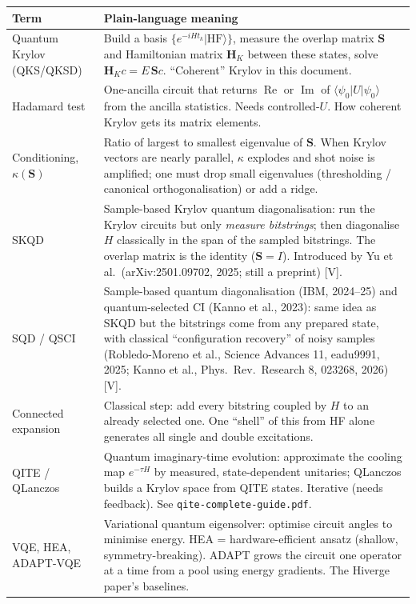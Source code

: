 \documentclass[11pt,a4paper]{article}
\newcommand{\ket}[1]{\lvert #1\rangle}
\newcommand{\bra}[1]{\langle #1\rvert}
\newcommand{\lV}{\textcolor{keyblue}{[V]}}   %
\begin{document}
\begin{center}\small
\begin{tabularx}{\linewidth}{@{}L{3.4cm}Y@{}}
\toprule
Term & Plain-language meaning\\\midrule
Quantum Krylov (QKS/QKSD) & Build a basis $\{e^{-iHt_k}\ket{\mathrm{HF}}\}$, measure the overlap matrix $\mathbf S$ and Hamiltonian matrix $\mathbf H_K$ between these states, solve $\mathbf H_K c=E\,\mathbf S c$. ``Coherent'' Krylov in this document.\\
Hadamard test & One-ancilla circuit that returns $\operatorname{Re}$ or $\operatorname{Im}$ of $\bra{\psi_0}U\ket{\psi_0}$ from the ancilla statistics. Needs controlled-$U$. How coherent Krylov gets its matrix elements.\\
Conditioning, $\kappa(\mathbf S)$ & Ratio of largest to smallest eigenvalue of $\mathbf S$. When Krylov vectors are nearly parallel, $\kappa$ explodes and shot noise is amplified; one must drop small eigenvalues (thresholding / canonical orthogonalisation) or add a ridge.\\
SKQD & Sample-based Krylov quantum diagonalisation: run the Krylov circuits but only \emph{measure bitstrings}; then diagonalise $H$ classically in the span of the sampled bitstrings. The overlap matrix is the identity ($\mathbf S=I$). Introduced by Yu et al.\ (arXiv:2501.09702, 2025; still a preprint) \lV.\\
SQD / QSCI & Sample-based quantum diagonalisation (IBM, 2024--25) and quantum-selected CI (Kanno et al., 2023): same idea as SKQD but the bitstrings come from any prepared state, with classical ``configuration recovery'' of noisy samples (Robledo-Moreno et al., Science Advances 11, eadu9991, 2025; Kanno et al., Phys.\ Rev.\ Research 8, 023268, 2026) \lV.\\
Connected expansion & Classical step: add every bitstring coupled by $H$ to an already selected one. One ``shell'' of this from HF alone generates all single and double excitations.\\
QITE / QLanczos & Quantum imaginary-time evolution: approximate the cooling map $e^{-\tau H}$ by measured, state-dependent unitaries; QLanczos builds a Krylov space from QITE states. Iterative (needs feedback). See \texttt{qite-complete-guide.pdf}.\\
VQE, HEA, ADAPT-VQE & Variational quantum eigensolver: optimise circuit angles to minimise energy. HEA = hardware-efficient ansatz (shallow, symmetry-breaking). ADAPT grows the circuit one operator at a time from a pool using energy gradients. The Hiverge paper's baselines.\\
\bottomrule
\end{tabularx}
\end{center}
\end{document}
